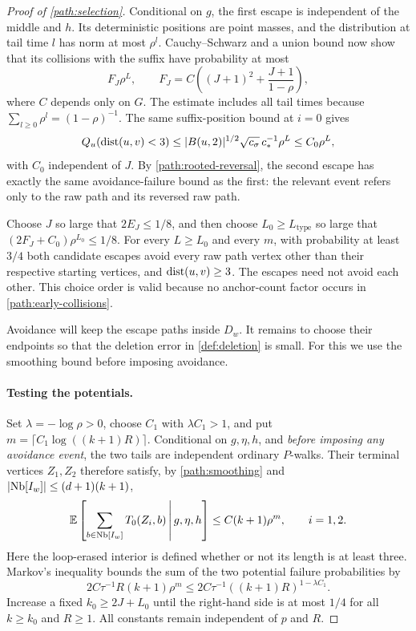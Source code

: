 \begin{proof}[Proof of \cref{path:selection}]
Conditional on $g$, the first escape is independent of the middle and
$h$. Its deterministic positions are point masses, and the distribution
at tail time $l$ has norm at most $\rho^l$. Cauchy--Schwarz and a union
bound now show that its collisions with the suffix have probability at
most
\begin{equation}
 F_J\rho^L,\qquad
 F_J=C\left((J+1)^2+\frac{J+1}{1-\rho}\right),
 \label{path:suffix-collisions}
\end{equation}
where $C$ depends only on $G$. The estimate includes all tail times
because $\sum_{l\ge0}\rho^l=(1-\rho)^{-1}$. The same suffix-position
bound at $i=0$ gives
\[
 Q_u(\operatorname{dist}(u,v)<3)
 \le \lvert B(u,2)\rvert^{1/2}\sqrt{c_\sigma}\,c_*^{-1}\rho^L
 \le C_0\rho^L,
\]
with $C_0$ independent of $J$. By \eqref{path:rooted-reversal}, the
second escape has exactly the same avoidance-failure bound as the
first: the relevant event refers only to the raw path and its reversed
raw path.

Choose $J$ so large that $2E_J\le1/8$, and then choose
$L_0\ge L_{\mathrm{type}}$ so large that
$(2F_J+C_0)\rho^{L_0}\le1/8$. For every $L\ge L_0$ and every $m$,
with probability at least $3/4$ both candidate escapes avoid every raw
path vertex other than their respective starting vertices, and
$\operatorname{dist}(u,v)\ge3$. The escapes need not avoid each other. This choice
order is valid because no anchor-count factor occurs in
\eqref{path:early-collisions}.

Avoidance will keep the escape paths inside $D_w$. It remains to choose
their endpoints so that the deletion error in \cref{def:deletion} is
small. For this we use the smoothing bound before imposing avoidance.

\paragraph{Testing the potentials.}
Set $\lambda=-\log\rho>0$, choose $C_1$ with $\lambda C_1>1$, and put
$m=\lceil C_1\log((k+1)R)\rceil$. Conditional on $g,\eta,h$, and
\emph{before imposing any avoidance event}, the two tails are independent
ordinary $P$-walks. Their terminal vertices $Z_1,Z_2$ therefore satisfy,
by \cref{path:smoothing} and $\lvert\operatorname{Nb}[I_w]\rvert\le(d+1)(k+1)$,
\[
 \mathbb E\left[\sum_{b\in\operatorname{Nb}[I_w]}T_0(Z_i,b)\,\middle|\,g,\eta,h\right]
 \le C(k+1)\rho^m,\qquad i=1,2.
\]
Here the loop-erased interior is defined whether or not its length is
at least three. Markov's inequality bounds the sum of the two potential
failure probabilities by
\begin{equation}
 2C\tau^{-1}R(k+1)\rho^m
 \le 2C\tau^{-1}((k+1)R)^{1-\lambda C_1}.
 \label{path:potential-failures}
\end{equation}
Increase a fixed $k_0\ge2J+L_0$ until the right-hand side is at most
$1/4$ for all $k\ge k_0$ and $R\ge1$. All constants remain independent
of $p$ and $R$.


\end{proof}
